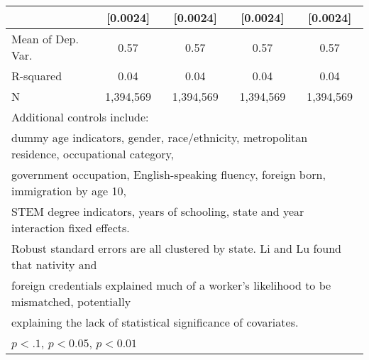 \begin{table}[htbp]
\begin{tabular}{l*{4}{c}}
                    &    [0.0024]         &    [0.0024]         &    [0.0024]         &    [0.0024]         \\
\midrule
Mean of Dep. Var.   &        0.57         &        0.57         &        0.57         &        0.57         \\
R-squared           &        0.04         &        0.04         &        0.04         &        0.04         \\
N                   &   1,394,569         &   1,394,569         &   1,394,569         &   1,394,569         \\
\bottomrule
\multicolumn{5}{l}{\footnotesize Additional controls include:}\\
\multicolumn{5}{l}{\footnotesize dummy age indicators, gender, race/ethnicity, metropolitan residence, occupational category,}\\
\multicolumn{5}{l}{\footnotesize government occupation, English-speaking fluency, foreign born, immigration by age 10,}\\
\multicolumn{5}{l}{\footnotesize STEM degree indicators, years of schooling, state and year interaction fixed effects.}\\
\multicolumn{5}{l}{\footnotesize Robust standard errors are all clustered by state. Li and Lu found that nativity and}\\
\multicolumn{5}{l}{\footnotesize foreign credentials explained much of a worker's likelihood to be mismatched, potentially}\\
\multicolumn{5}{l}{\footnotesize explaining the lack of statistical significance of covariates.}\\
\multicolumn{5}{l}{\footnotesize \sym{*} \(p<.1\), \sym{**} \(p<0.05\), \sym{***} \(p<0.01\)}\\
\end{tabular}
\end{table}
